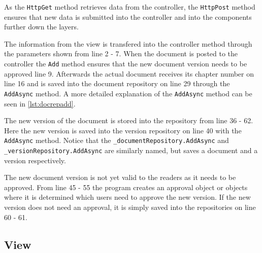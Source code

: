 As the \texttt{HttpGet} method retrieves data from the controller, the \texttt{HttpPost} method ensures that new data is submitted into the controller and into the components further down the layers.

The information from the view is transfered into the controller method through the parameters shown from line 2 - 7.
When the document is posted to the controller the \texttt{Add} method ensures that the new document version needs to be approved line 9.
Afterwards the actual document receives its chapter number on line 16 and is saved into the document repository on line 29 through the \texttt{AddAsync} method.
A more detailed explanation of the \texttt{AddAsync} method can be seen in \cref{lst:docrepadd}.

The new version of the document is stored into the repository from line 36 - 62.
Here the new version is saved into the version repository on line 40 with the \texttt{AddAsync} method.
Notice that the \texttt{_documentRepository.AddAsync} and \texttt{_versionRepository.AddAsync} are similarly named, but saves a document and a version respectively.

The new document version is not yet valid to the readers as it needs to be approved.
From line 45 - 55 the program creates an approval object or objects where it is determined which users need to approve the new version.
If the new version does not need an approval, it is simply saved into the repositories on line 60 - 61.

\subsection{View}

